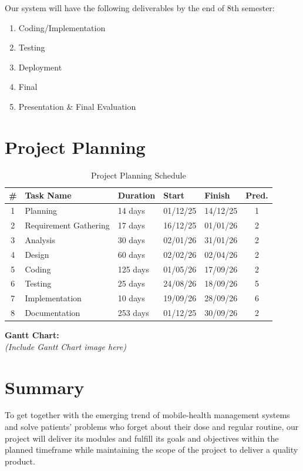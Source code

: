 Our system will have the following deliverables by the end of 8th semester:
\begin{enumerate}
    \item Coding/Implementation
    \item Testing
    \item Deployment
    \item Final
    \item Presentation \& Final Evaluation
\end{enumerate}

\section{Project Planning}
\label{sec:planning}

\begin{table}[H]
\centering
\caption{Project Planning Schedule}
\label{tab:planning}
\begin{tabular}{|c|l|l|l|l|c|}
\hline
\textbf{\#} & \textbf{Task Name} & \textbf{Duration} & \textbf{Start} & \textbf{Finish} & \textbf{Pred.} \\ \hline
1 & Planning & 14 days & 01/12/25 & 14/12/25 & 1 \\ \hline
2 & Requirement Gathering & 17 days & 16/12/25 & 01/01/26 & 2 \\ \hline
3 & Analysis & 30 days & 02/01/26 & 31/01/26 & 2 \\ \hline
4 & Design & 60 days & 02/02/26 & 02/04/26 & 2 \\ \hline
5 & Coding & 125 days & 01/05/26 & 17/09/26 & 2 \\ \hline
6 & Testing & 25 days & 24/08/26 & 18/09/26 & 5 \\ \hline
7 & Implementation & 10 days & 19/09/26 & 28/09/26 & 6 \\ \hline
8 & Documentation & 253 days & 01/12/25 & 30/09/26 & 2 \\ \hline
\end{tabular}
\end{table}

\textbf{Gantt Chart:}\\
\textit{(Include Gantt Chart image here)}\\

\section{Summary}
\label{sec:ch1-summary}

To get together with the emerging trend of mobile-health management systems and solve patients' problems who forget about their dose and regular routine, our project will deliver its modules and fulfill its goals and objectives within the planned timeframe while maintaining the scope of the project to deliver a quality product.
